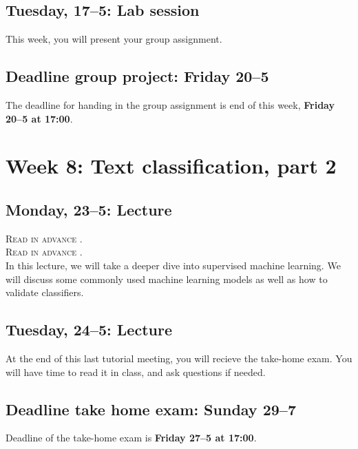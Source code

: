 \subsection*{Tuesday, 17--5: Lab session}
This week, you will present your group assignment. 

\subsection*{Deadline group project: Friday 20--5}
The deadline for handing in the group assignment is end of this week, \textbf{Friday 20--5 at 17:00}.

\section*{Week 8: Text classification, part 2}

\subsection*{Monday, 23--5: Lecture}
\textsc{ Read in advance \cite{jordan_machine_2015}.}\\
\textsc{ Read in advance \cite{meppelink_reliable_2021}.}\\

In this lecture, we will take a deeper dive into supervised machine learning. We will discuss some commonly used machine learning models as well as how to validate classifiers.

\subsection*{Tuesday, 24--5: Lecture}
At the end of this last tutorial meeting, you will recieve the take-home exam. You will have time to read it in class, and ask questions if needed. \\

\subsection*{Deadline take home exam: Sunday 29--7}
Deadline of the take-home exam is \textbf{Friday 27--5 at 17:00}.







